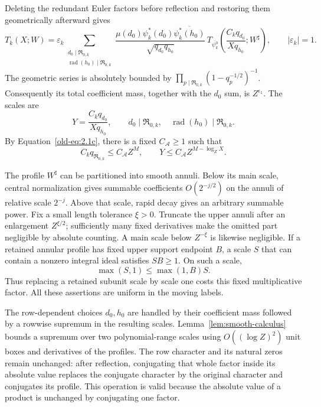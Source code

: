 \documentclass[11pt,a4paper]{article}
\numberwithin{equation}{section}
\numberwithin{figure}{section}
\theoremstyle{definition}
\theoremstyle{remark}
\begin{document}
Deleting the redundant Euler factors before reflection and restoring
them geometrically afterward gives
\[
 T_k(X;W)
 =\varepsilon_k
 \sum_{\substack{d_0\mid\mathfrak R_{0,k}\\
                  \operatorname{rad}(h_0)\mid\mathfrak R_{0,k}}}
 \frac{\mu(d_0)\psi_k^*(d_0)\overline{\psi_k^*(h_0)}}
      {\sqrt{q_{d_0}q_{h_0}}}\,
 T_{\overline{\psi_k^0}}
   \left(\frac{C_kq_{d_0}}{Xq_{h_0}};W^\sharp\right),
 \qquad |\varepsilon_k|=1.
\]
The geometric series is absolutely bounded by
\(\prod_{p\mid\mathfrak R_{0,k}}(1-q_p^{-1/2})^{-1}\).
Consequently its total coefficient mass, together with the \(d_0\)
sum, is \(Z^{\epsilon_1}\).  The scales are
\begin{equation}
 Y=\frac{C_kq_{d_0}}{Xq_{h_0}},\qquad
 d_0\mid\mathfrak R_{0,k},\quad
 \operatorname{rad}(h_0)\mid\mathfrak R_{0,k}.
 \label{old-eq:2.1d}
\end{equation}
By Equation~\eqref{old-eq:2.1c}, there is a fixed \(C_{\mathcal A}\ge1\)
such that
\[
 C_kq_{\mathfrak R_{0,k}}\le C_{\mathcal A}Z^M,\qquad
 Y\le C_{\mathcal A}Z^{M-\log_ZX}.
\]

The profile \(W^\sharp\) can be partitioned into smooth annuli.
Below its main scale, central normalization gives summable
coefficients \(O(2^{-j/2})\) on the annuli of relative scale \(2^{-j}\).
Above that scale, rapid decay gives an arbitrary summable power.
Fix a small length tolerance \(\xi>0\).  Truncate the upper annuli
after an enlargement \(Z^{\xi/2}\); sufficiently many fixed derivatives
make the omitted part negligible by absolute counting.  A main scale
below \(Z^{-\xi}\) is likewise negligible.  If a retained annular
profile has fixed upper support endpoint \(B\), a scale \(S\) that
can contain a nonzero integral ideal satisfies \(SB\ge1\).  On such
a scale,
\[
 \max(S,1)\le\max(1,B)S.
\]
Thus replacing a retained subunit scale by scale one costs this fixed
multiplicative factor.  All these assertions are uniform in the moving labels.

The row-dependent choices \(d_0,h_0\) are handled by their coefficient
mass followed by a rowwise supremum in the resulting scales.
Lemma~\ref{lem:smooth-calculus} bounds a supremum over two
polynomial-range scales using \(O((\log Z)^2)\) unit boxes and
derivatives of the profiles.  The row character and its natural zeros
remain unchanged: after reflection, conjugating that whole factor
inside its absolute value replaces the conjugate character by the
original character and conjugates its profile.  This operation is
valid because the absolute value of a product is unchanged by
conjugating one factor.
\end{document}
